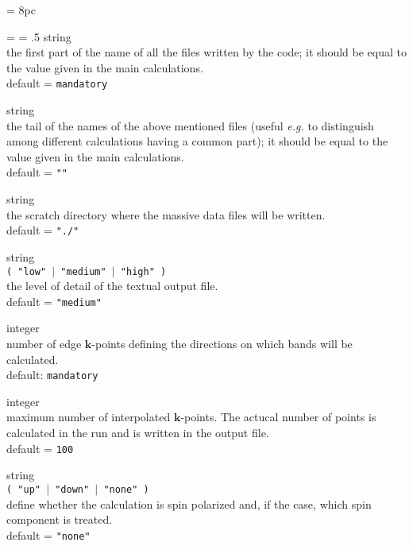 \newdimen\descindent \descindent = 8pc
{\noindent \leftskip = \descindent \parskip = .5\baselineskip
{}%
{\sc string} \\ the first part of the name of all the files written by the code;
              it should be equal to the value given in the main calculations.\\
{\sc default} = {\tt mandatory} \par

\noindent{}%
{\sc string} \\ the tail of the names of the above mentioned files (useful 
    {\it e.g.} to distinguish among different calculations having a common part);
    it should be equal to the value given in the main calculations.\\
    {\sc default} = {\tt ""} \par

\noindent{}%
{\sc string} \\ the scratch directory where the massive data files will be written.\\
              {\sc default} = {\tt "./"} \par

\noindent{}%
{\sc string} \\ {\tt ( "low" $\mid$ "medium" $\mid$ "high" ) }\\
              the level of detail of the textual output file.\\
              {\sc default} =  {\tt "medium"} \par

\noindent{}%
{\sc integer} \\ number of edge $\mathbf{k}$-points defining the directions 
on which bands will be calculated.\\ 
{\sc default}: {\tt mandatory} \par

\noindent{}%
{\sc integer} \\ maximum number of interpolated $\mathbf{k}$-points. The actucal number
of points is calculated in the run and is written in the output file.\\ 
{\sc default} = {\tt 100} \par

\noindent{}%
{\sc string} \\  {\tt ( "up" $\mid$ "down" $\mid$ "none" ) }\\
              define whether the calculation is spin polarized and, if the case,
              which spin component is treated.\\ 
{\sc default} = {\tt "none"} \par
}\bigskip

